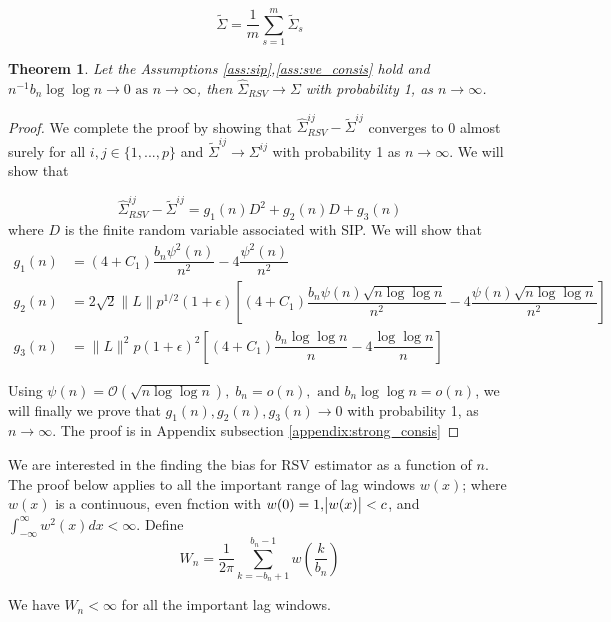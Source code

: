 \documentclass[11pt]{article}
\newtheorem{theorem}{Theorem}
\theoremstyle{remark}
\begin{document}
\[
\tilde{\Sigma} = \dfrac{1}{m}\sum\limits_{s=1}^{m}\tilde{\Sigma}_s
\]


\begin{theorem}
\label{th:consistency}
 Let the Assumptions \ref{ass:sip},\ref{ass:sve_consis} hold and $n^{-1}{b_n \log \log n} \to 0 \textrm{ as } n \to \infty$, then $\hat{\Sigma}_{RSV} \to \Sigma$ with probability 1, as $n \to \infty$.
\end{theorem} 

\begin{proof}
We complete the proof by showing that $\hat{\Sigma}_{RSV}^{ij} - \tilde{\Sigma}^{ij}$ converges to 0 almost surely for all $i,j \in \{1,...,p\}$ and $\tilde{\Sigma}^{ij} \to \Sigma^{ij}$ with probability 1 as $n \to \infty$. We will show that 

\[
\hat{\Sigma}_{RSV}^{ij} - \tilde{\Sigma}^{ij} = g_1(n)D^2 + g_2(n)D + g_3(n)
\]
where $D$ is the finite random variable associated with SIP. We will show that
\begin{align*}
    g_1(n) &= (4+C_1)\dfrac{b_n \psi^2(n)}{n^2} - 4\dfrac{\psi^2(n)}{n^2}\\
    g_2(n) &= 2\sqrt{2}\|L\|p^{1/2}(1+\epsilon)\left[(4+C_1)\dfrac{b_n\psi(n)\sqrt{n\log \log n}}{n^2} - 4\dfrac{\psi(n)\sqrt{n\log \log n}}{n^2}\right]\\
    g_3(n) &= \|L\|^2 p (1+\epsilon)^2\left[(4+C_1)\dfrac{b_n \log\log n}{n} - 4 \dfrac{\log \log n}{n}\right]
\end{align*}

Using $\psi(n) = \mathcal{O}(\sqrt{n \log \log n}),\; b_n = o(n), \textrm{ and } b_n \log \log n = o(n)$, we will finally we prove that $g_1(n), g_2(n), g_3(n) \to 0$ with probability 1, as $n \to \infty$. The proof is in Appendix subsection \ref{appendix:strong_consis}
\end{proof}

We are interested in the finding the bias for RSV estimator as a function of $n$. The proof below applies to all the important range of lag windows $w(x)$; where $w(x)$ is a continuous, even fnction with $w(0)=1, \abs{w(x)} < c$, and $\int_{-\infty}^{\infty}w^2(x)dx < \infty$. Define
%
\[
W_n = \dfrac{1}{2\pi}\sum_{k=-b_n+1}^{b_n-1}w\left(\dfrac{k}{b_n}\right)
\]

We have $W_n < \infty$ for all the important lag windows.
\end{document}
